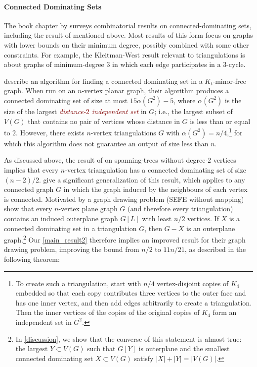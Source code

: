 \documentclass{article}
\newcommand{\defin}[1]{\emph{\textcolor{Maroon}{#1}}}
\theoremstyle{definition}
\begin{document}
\paragraph{Connected Dominating Sets}

The book chapter by \citet{chellali.favaron:connected} surveys combinatorial results on connected-dominating sets, including the result of \citet{kleitman.west:spanning} mentioned above.  Most results of this form focus on graphs with lower bounds on their minimum degree, possibly combined with some other constraints.  For example, the Kleitman-West result relevant to triangulations is about graphs of minimum-degree $3$ in which each edge participates in a $3$-cycle.

\citet{wan.alzoubi.ea:simple} describe an algorithm for finding a connected dominating set in a $K_t$-minor-free graph. When run on an $n$-vertex planar graph, their algorithm produces a connected dominating set of size at most $15\alpha(G^2)-5$, where $\alpha(G^2)$ is the size of the largest \defin{distance-$2$ independent set} in $G$; i.e., the largest subset of $V(G)$ that contains no pair of vertices whose distance in $G$ is less than or equal to $2$.  However, there exists $n$-vertex triangulations $G$ with $\alpha(G^2)=n/4$,\footnote{To create such a triangulation, start with $n/4$ vertex-disjoint copies of $K_4$ embedded so that each copy contributes three vertices to the outer face and has one inner vertex, and then add edges arbitrarily to create a triangulation.  Then the inner vertices of the copies of the original copies of $K_4$ form an independent set in $G^2$.} for which this algorithm does not guarantee an output of size less than $n$.

As discussed above, the result of \citet{albertson.berman.ea:graphs} on spanning-trees without degree-$2$ vertices implies that every $n$-vertex triangulation has a connected dominating set of size $(n-2)/2$.  \citet{chen.ren.ea:homeomorphically} give a significant generalization of this result, which applies to any connected graph $G$ in which the graph induced by the neighbours of each vertex is connected.
 Motivated by  a graph drawing problem (SEFE without mapping) \citet{angelini.evans.ea:sefe} show that every $n$-vertex plane graph $G$ (and therefore every triangulation) contains an induced outerplane graph $G[L]$ with least $n/2$ vertices.  If $X$ is a connected dominating set in a triangulation $G$, then $G-X$ is an outerplane graph.\footnote{In \cref{discussion}, we show that the converse of this statement is almost true: the largest $Y\subset V(G)$ such that $G[Y]$ is outerplane and the smallest connected dominating set $X\subset V(G)$ satisfy $|X|+|Y|=|V(G)|$.}  Our \cref{main_result2} therefore implies an improved result for their graph drawing problem, improving the bound from $n/2$ to $11n/21$, as described in the following theorem:
\end{document}

